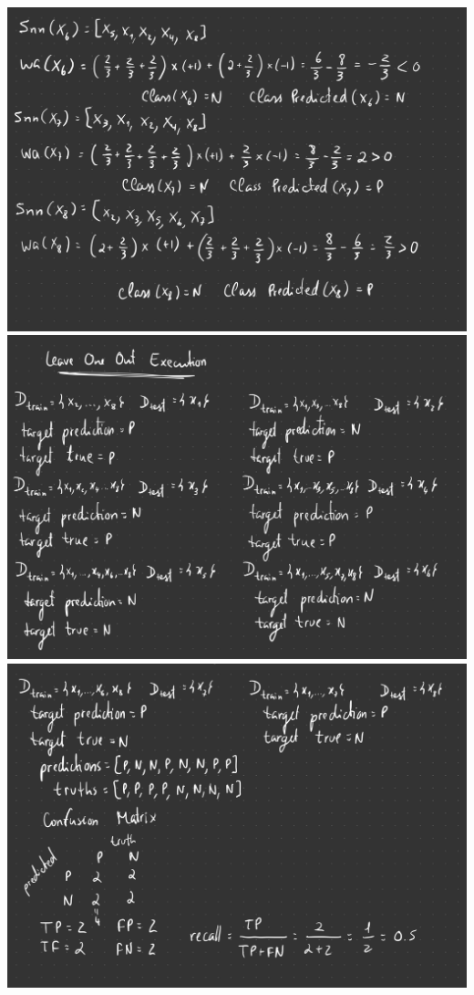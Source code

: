 \documentclass[12pt]{article}
\begin{document}
\begin{enumerate}[leftmargin=\labelsep]
\begin{center}
\newline
\includegraphics[scale=0.2]{images/Project-07.jpg}
\newline
\includegraphics[scale=0.2]{images/Project-08.jpg}
\newline
\includegraphics[scale=0.2]{images/Project-09.jpg}
\newline
\end{center}
\newpage


\end{enumerate}
\end{document}
